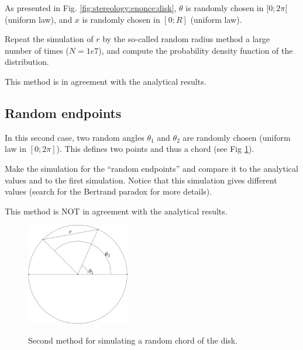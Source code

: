\vspace*{-10pt}

As presented in Fig. \ref{fig:stereology:enonce:disk}, $\theta$ is randomly chosen in $[0;2\pi[$ (uniform law), and $x$ is randomly chosen in $[0;R]$ (uniform law). 

\begin{qbox}Repeat the simulation of $r$ by the so-called random radius method a large number of times ($N=1e7$), and compute the probability density function of the distribution.
\end{qbox}
\begin{rmq}This method is in agreement with the analytical results.
\end{rmq}

\vspace*{-6pt}


\subsection{Random endpoints}\vspace*{-2pt}
In this second case, two random angles $\theta_1$ and $\theta_2$ are randomly chosen (uniform law in $[0;2\pi]$). This defines two points and thus a chord (see Fig \ref{fig:stereology:enonce:disk2}). 

\begin{qbox}
Make the simulation for the ``random endpoints'' and compare it to the analytical values and to the first simulation. Notice that this simulation gives different values (search for the Bertrand paradox for more details).
\end{qbox}

\begin{rmq}This method is NOT in agreement with the analytical results.
\end{rmq}

\vspace*{-10pt}

\begin{figure}[H]
 \centering\caption{Second method for simulating a random chord of the disk.}%
 \includegraphics[width=4.5cm]{section_disk2T.png}%
 \label{fig:stereology:enonce:disk2}%
\end{figure}


